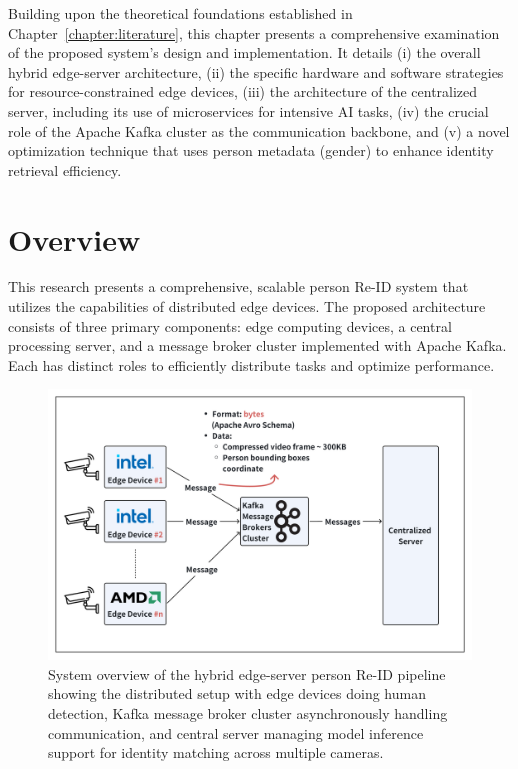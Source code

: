 \documentclass[../main.tex]{subfiles}
\begin{document}
Building upon the theoretical foundations established in Chapter~\ref{chapter:literature}, this chapter presents a comprehensive examination of the proposed system's design and implementation. It details (i) the overall hybrid edge-server architecture, (ii) the specific hardware and software strategies for resource-constrained edge devices, (iii) the architecture of the centralized server, including its use of microservices for intensive AI tasks, (iv) the crucial role of the Apache Kafka cluster as the communication backbone, and (v) a novel optimization technique that uses person metadata (gender) to enhance identity retrieval efficiency.

\section{Overview}
\label{sec:overview}

This research presents a comprehensive, scalable person Re-ID system that utilizes the capabilities of distributed edge devices. The proposed architecture consists of three primary components: edge computing devices, a central processing server, and a message broker cluster implemented with Apache Kafka. Each has distinct roles to efficiently distribute tasks and optimize performance.

\begin{figure}[htbp]
    \centering
    \includegraphics[width=1\textwidth]{Figure/system_overview.png}
    \caption{System overview of the hybrid edge-server person Re-ID pipeline showing the distributed setup with edge devices doing human detection, Kafka message broker cluster asynchronously handling communication, and central server managing model inference support for identity matching across multiple cameras.}
    \label{fig:system_overview}
\end{figure}
\end{document}
